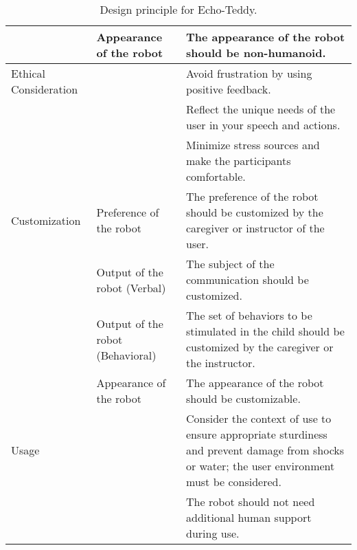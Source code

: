 \begin{table*}[hbt!]
\begin{tabular}{p{2cm} p{3cm} p{7cm}}
                                    & Appearance of the robot                   & The appearance of the robot should be non-humanoid.                                                                                              \\
\hline
Ethical Consideration               &                                           & Avoid frustration by using positive feedback.                                                                                                    \\
                                    &                                           & Reflect the unique needs of the user in your speech and actions.                                                                                 \\
                                    &                                           & Minimize stress sources and make the participants comfortable.                                                                                   \\
\hline
Customization                      & Preference of the robot                   & The preference of the robot should be customized by the caregiver or instructor of the user.                                                     \\
                                    & Output of the robot (Verbal)              & The subject of the communication should be customized.                                                                                           \\
                                    & Output of the robot (Behavioral)          & The set of behaviors to be stimulated in the child should be customized by the caregiver or the instructor.                                       \\
                                    & Appearance of the robot                   & The appearance of the robot should be customizable.                                                                                              \\
\hline
Usage                               &                                           & Consider the context of use to ensure appropriate sturdiness and prevent damage from shocks or water; the user environment must be considered.   \\
                                    &                                           & The robot should not need additional human support during use.\\
\hline
\end{tabular}
\caption{Design principle for Echo-Teddy.}
\end{table*}

